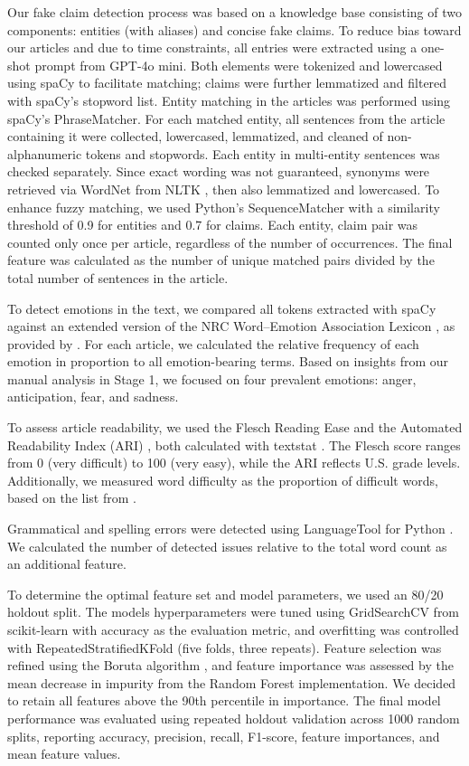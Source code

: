 \documentclass[12pt,a4paper,twocolumn]{article}
\begin{document}
Our fake claim detection process was based on a knowledge base consisting of two components: entities (with aliases) and concise fake claims. To reduce bias toward our articles and due to time constraints, all entries were extracted using a one-shot prompt from GPT-4o mini. Both elements were tokenized and lowercased using spaCy to facilitate matching; claims were further lemmatized and filtered with spaCy’s stopword list. Entity matching in the articles was performed using spaCy’s PhraseMatcher. For each matched entity, all sentences from the article containing it were collected, lowercased, lemmatized, and cleaned of non-alphanumeric tokens and stopwords. Each entity in multi-entity sentences was checked separately. Since exact wording was not guaranteed, synonyms were retrieved via WordNet from NLTK \citep{NLTK}, then also lemmatized and lowercased. To enhance fuzzy matching, we used Python’s SequenceMatcher with a similarity threshold of 0.9 for entities and 0.7 for claims. Each entity, claim pair was counted only once per article, regardless of the number of occurrences. The final feature was calculated as the number of unique matched pairs divided by the total number of sentences in the article.

To detect emotions in the text, we compared all tokens extracted with spaCy against an extended version of the NRC Word–Emotion Association Lexicon \citep{emotions}, as provided by \citet{NRClex}. For each article, we calculated the relative frequency of each emotion in proportion to all emotion-bearing terms. Based on insights from our manual analysis in Stage 1, we focused on four prevalent emotions: anger, anticipation, fear, and sadness.

To assess article readability, we used the Flesch Reading Ease \citep{flesch} and the Automated Readability Index (ARI) \citep{senter_smith_1967}, both calculated with textstat \citep{textstat}. The Flesch score ranges from 0 (very difficult) to 100 (very easy), while the ARI reflects U.S. grade levels. Additionally, we measured word difficulty as the proportion of difficult words, based on the list from \citet{chall1995readability}.

Grammatical and spelling errors were detected using LanguageTool for Python \citep{ltp}. We calculated the number of detected issues relative to the total word count as an additional feature.

To determine the optimal feature set and model parameters, we used an 80/20 holdout split. The models hyperparameters were tuned using GridSearchCV from scikit-learn with accuracy as the evaluation metric, and overfitting was controlled with RepeatedStratifiedKFold (five folds, three repeats). Feature selection was refined using the Boruta algorithm \citep{boruta1, boruta2}, and feature importance was assessed by the mean decrease in impurity from the Random Forest implementation. We decided to retain all features above the 90th percentile in importance. The final model performance was evaluated using repeated holdout validation across 1000 random splits, reporting accuracy, precision, recall, F1-score, feature importances, and mean feature values.
\end{document}
